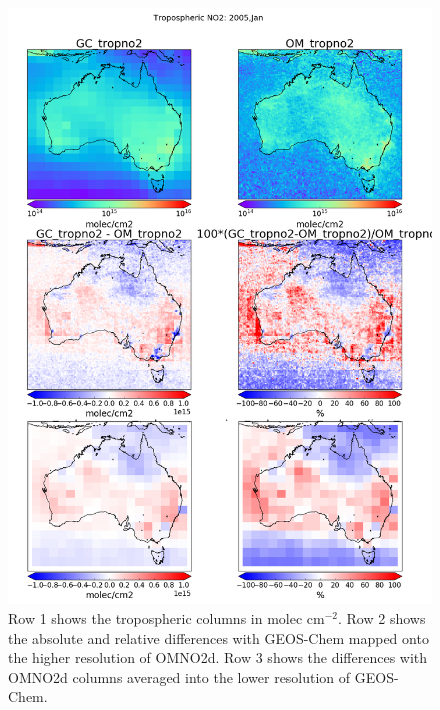     \begin{figure}[!htbp]
      \includegraphics[width=\textwidth]{Figures/GEOSChem/GC_vs_OMNO2_bires_200501.png}
      \caption{%
        Row 1 shows the tropospheric columns in molec cm$^{-2}$.
        Row 2 shows the absolute and relative differences with GEOS-Chem mapped onto the higher resolution of OMNO2d.
        Row 3 shows the differences with OMNO2d columns averaged into the lower resolution of GEOS-Chem.
      }
      \label{Model:Analysis:NOx:fig_GC_vs_OMNO2d_2005}
    \end{figure}